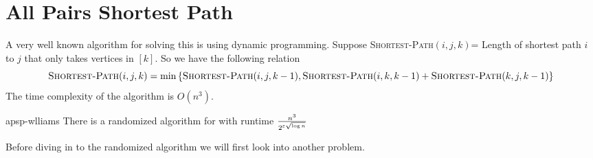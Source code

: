 \section{All Pairs Shortest Path}
\begin{algoprob}
\end{algoprob}

A very well known algorithm for solving this is  using dynamic programming.  Suppose \textsc{Shortest-Path}$(i,j,k)$= Length of shortest path $i$ to $j$ that only takes vertices in $[k]$. So we have the following relation $$\textsc{Shortest-Path}(i,j,k)=\min\left\{  \textsc{Shortest-Path}(i,j,k-1), \textsc{Shortest-Path}(i,k,k-1)+\textsc{Shortest-Path}(k,j,k-1)  \right\}$$The time complexity of the algorithm is $O(n^3)$.

\begin{theorem}{\cite{Williams_2014_Fap_CONF}}{apsp-wlliams}
	There is a randomized algorithm for  with runtime $\frac{n^3}{2^{\varepsilon\sqrt{\log n}}}$
\end{theorem}
 Before diving in to the randomized algorithm we will first look into another problem.



